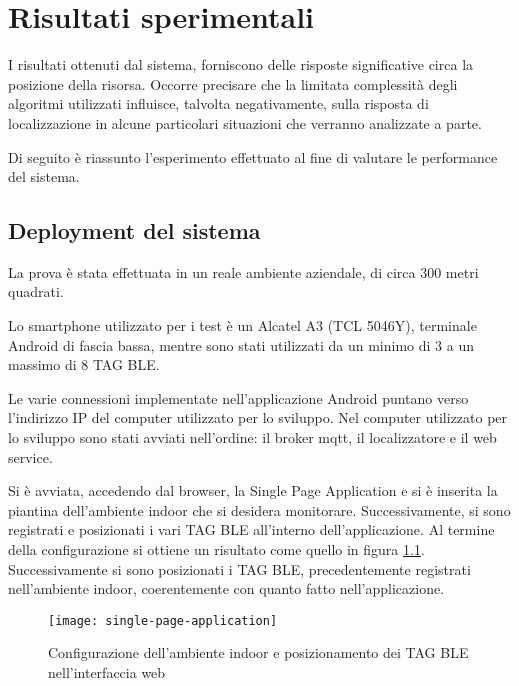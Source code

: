 
\chapter{Risultati sperimentali}
\label{cap:risultati-sperimentali}

I risultati ottenuti dal sistema, forniscono delle risposte significative circa la posizione della risorsa. Occorre precisare che la limitata complessità degli algoritmi utilizzati influisce, talvolta negativamente, sulla risposta di localizzazione in alcune particolari situazioni che verranno analizzate a parte.

Di seguito è riassunto l'esperimento effettuato al fine di valutare le performance del sistema.

\section{Deployment del sistema}
La prova è stata effettuata in un reale ambiente aziendale, di circa 300 metri quadrati.

Lo smartphone utilizzato per i test è un Alcatel A3 (TCL 5046Y), terminale Android di fascia bassa, mentre sono stati utilizzati da un minimo di 3 a un massimo di 8 TAG BLE.

Le varie connessioni implementate nell'applicazione Android puntano verso l'indirizzo IP del computer utilizzato per lo sviluppo.
Nel computer utilizzato per lo sviluppo sono stati avviati nell'ordine: il broker mqtt, il localizzatore e il web service.

Si è avviata, accedendo dal browser, la Single Page Application e si è inserita la piantina dell'ambiente indoor che si desidera monitorare. Successivamente, si sono registrati e posizionati i vari TAG BLE all'interno dell'applicazione. Al termine della configurazione si ottiene un risultato come quello in figura \ref{fig:single-page-application}. Successivamente si sono posizionati i TAG BLE, precedentemente registrati nell'ambiente indoor, coerentemente con quanto fatto nell'applicazione.

\begin{figure}[htp]
	\centering
	\texttt{[image: single-page-application]}
	\caption{Configurazione dell'ambiente indoor e posizionamento dei TAG BLE nell'interfaccia web}
	\label{fig:single-page-application}
\end{figure}

